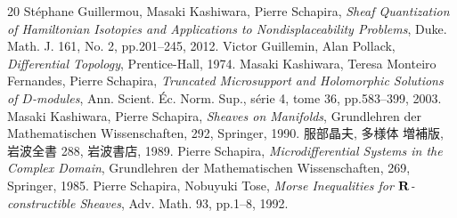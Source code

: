 \begin{thebibliography}{20} 
   St\'ephane Guillermou, 
  Masaki Kashiwara, Pierre Schapira, 
  \textit{Sheaf Quantization of Hamiltonian Isotopies and Applications to Nondisplaceability Problems}, 
  Duke. Math. J. 161, No. 2, pp.201--245, 2012.  
   Victor Guillemin, Alan Pollack, 
    \textit{Differential Topology}, 
    Prentice-Hall, 1974.
   Masaki Kashiwara, Teresa Monteiro Fernandes, Pierre Schapira, 
    \textit{Truncated Microsupport and Holomorphic Solutions 
    of \(D\)-modules}, 
    Ann. Scient. \'Ec. Norm. Sup., s\'erie 4, tome 36, 
    pp.583--399, 2003.
   Masaki Kashiwara, Pierre Schapira, 
    \textit{Sheaves on Manifolds}, 
    Grundlehren der Mathematischen Wissenschaften, 292, Springer, 1990.
   服部晶夫, 多様体 増補版, 岩波全書 288, 岩波書店, 1989.
   Pierre Schapira, 
    \textit{Microdifferential Systems in the Complex Domain}, 
    Grundlehren der Mathematischen Wissenschaften, 269, 
    Springer, 1985.
   Pierre Schapira, Nobuyuki Tose, 
    \textit{Morse Inequalities for \(\mathbf{R}\)-constructible Sheaves}, 
    Adv. Math. 93, pp.1--8, 1992. 
\end{thebibliography}






